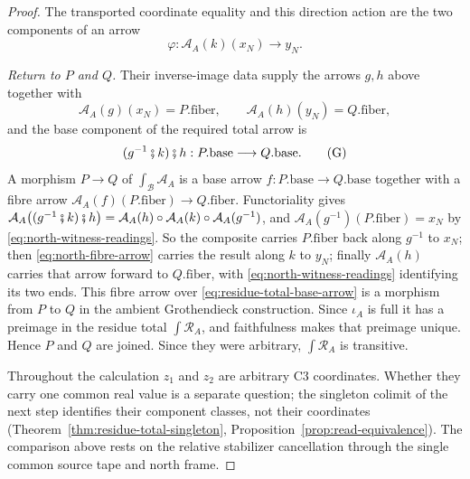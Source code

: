 \documentclass[11pt]{article}
\theoremstyle{plain}
\theoremstyle{definition}
\theoremstyle{remark}
\begin{document}
\begin{proof}
The transported coordinate equality and this direction action are the two
components of an arrow
\[
  \varphi:\mathcal A_A(k)(x_N)\longrightarrow y_N .
                                    \tag{$\Phi$}\label{eq:north-fibre-arrow}
\]

\medskip
\noindent\emph{Return to $P$ and $Q$.}
Their inverse-image data supply the arrows $g,h$ above together with
\[
  \mathcal A_A(g)(x_N)=P.\mathrm{fiber},\qquad
  \mathcal A_A(h)(y_N)=Q.\mathrm{fiber},
                                    \tag{N}\label{eq:north-witness-readings}
\]
and the base component of the required total arrow is
\[
  (g^{-1}\fatsemi k)\fatsemi h:
  P.\mathrm{base}\longrightarrow Q.\mathrm{base}.
                                    \tag{G}\label{eq:residue-total-base-arrow}
\]
A morphism $P\to Q$ of $\int_{\mathcal B}\mathcal A_A$ is a base arrow
$f:P.\mathrm{base}\to Q.\mathrm{base}$ together with a fibre arrow
$\mathcal A_A(f)(P.\mathrm{fiber})\to Q.\mathrm{fiber}$. Functoriality gives
$\mathcal A_A\bigl((g^{-1}\fatsemi k)\fatsemi h\bigr)
 =\mathcal A_A(h)\circ\mathcal A_A(k)\circ\mathcal A_A(g^{-1})$, and
$\mathcal A_A(g^{-1})(P.\mathrm{fiber})=x_N$ by
\eqref{eq:north-witness-readings}. So the composite carries
$P.\mathrm{fiber}$ back along $g^{-1}$ to $x_N$; then
\eqref{eq:north-fibre-arrow} carries the result along $k$ to $y_N$; finally
$\mathcal A_A(h)$ carries that arrow forward to $Q.\mathrm{fiber}$, with
\eqref{eq:north-witness-readings} identifying its two ends. This fibre arrow
over \eqref{eq:residue-total-base-arrow} is a morphism from $P$ to $Q$ in the
ambient Grothendieck construction. Since $\iota_A$ is full it has a preimage in
the residue total $\int\mathcal R_A$, and faithfulness makes that preimage
unique. Hence $P$ and $Q$ are joined. Since they were arbitrary,
$\int\mathcal R_A$ is transitive.

Throughout the calculation $z_1$ and $z_2$ are arbitrary C3 coordinates.
Whether they carry one common real value is a separate question; the singleton colimit of
the next step identifies their component classes, not their coordinates
(Theorem~\ref{thm:residue-total-singleton}, Proposition~\ref{prop:read-equivalence}). The comparison above rests on the relative stabilizer cancellation
through the single common source tape and north frame.
\end{proof}
\end{document}
